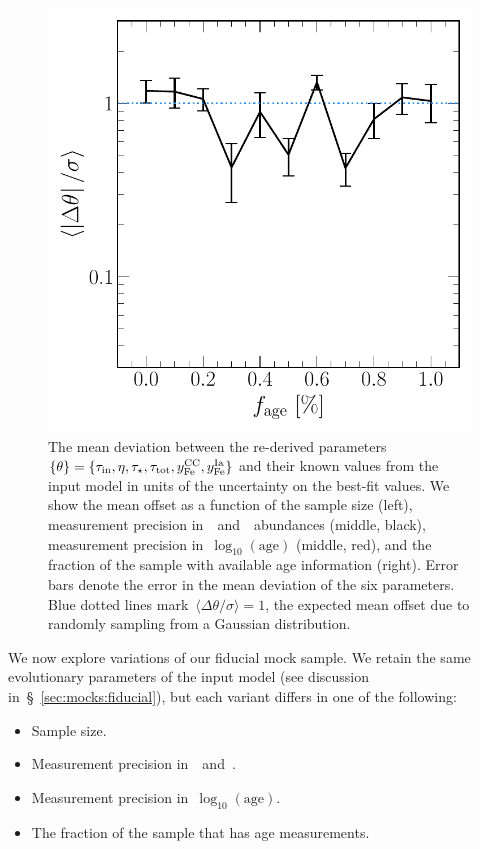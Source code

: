 \documentclass[ms.tex]{subfiles}
\begin{document}
\begin{figure}
\includegraphics[scale = 0.45]{dp_sigma_agefrac.pdf}
\caption{
The mean deviation between the re-derived parameters
$\{\theta\} = \{\tau_\text{in}, \eta, \tau_\star, \tau_\text{tot}, y_\text{Fe}^\text{CC},
y_\text{Fe}^\text{Ia}\}$ and their known values from the input model in units of the
uncertainty on the best-fit values.
We show the mean offset as a function of the sample size (left), measurement
precision in~\feh~and~\afe~abundances (middle, black), measurement precision
in~$\log_{10}(\text{age})$ (middle, red), and the fraction of the sample with
available age information (right).
Error bars denote the error in the mean deviation of the six parameters.
Blue dotted lines mark~$\langle \Delta \theta / \sigma \rangle = 1$, the
expected mean offset due to randomly sampling from a Gaussian distribution.
}
\label{fig:accuracy}
\end{figure}

We now explore variations of our fiducial mock sample.
We retain the same evolutionary parameters of the input model (see discussion
in~\S~\ref{sec:mocks:fiducial}), but each variant differs in one of the
following:
\begin{itemize}

	\item Sample size.

	\item Measurement precision in~\feh~and~\afe.

	\item Measurement precision in~$\log_{10}(\text{age})$.

	\item The fraction of the sample that has age measurements.

\end{itemize}
\end{document}
